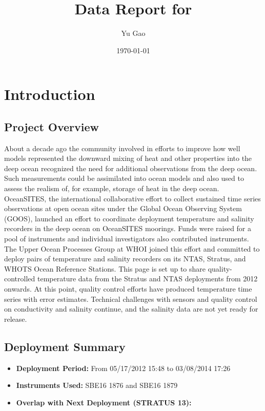\documentclass[11pt]{article}
\title{Data Report for \projectname{} \casenumber{}}
\author{Yu Gao}
\date{\today}
\newcommand{\projectname}{STRATUS}  %
\newcommand{\nextcasenumber}{13}  %
\newcommand{\FirstInstrumentType}{SBE16}  %
\newcommand{\SecondInstrumentType}{SBE16}  %
\newcommand{\DeploymentSpike}{05/17/2012 15:48} %
\newcommand{\RecoverySpike}{03/08/2014 17:26} %
\newcommand{\FirstInstrument}{1876}
\newcommand{\SecondInstrument}{1879}
\begin{document}
\maketitle
\tableofcontents
\newpage

\section{Introduction}

\subsection{Project Overview}

About a decade ago the community involved in  efforts to improve how well models
represented the downward mixing of heat and other properties into the deep ocean
recognized the need for additional observations from the deep ocean.  Such measurements
could be assimilated into ocean models and also used to assess the realism of, for example,
storage of heat in the deep ocean.  OceanSITES, the international collaborative effort to collect sustained time series observations at open ocean sites under the Global Ocean Observing System
(GOOS), launched an effort to coordinate deployment temperature and salinity
recorders in the deep ocean on OceanSITES moorings. Funds were raised for a pool of
instruments and individual investigators also contributed instruments. The Upper Ocean
Processes Group at WHOI joined this effort and committed to deploy pairs of temperature and salinity recorders on its NTAS, Stratus, and WHOTS Ocean Reference Stations.  This page is set
up to share quality-controlled temperature data from the Stratus and NTAS deployments from
2012 onwards.  At this point, quality control efforts have produced temperature time series with
error estimates.  Technical challenges with sensors and quality control on conductivity and salinity continue, and the salinity data are not yet ready for release.

\subsection{Deployment Summary}
\begin{itemize}
    \item \textbf{Deployment Period:} From \DeploymentSpike{} to \RecoverySpike{}
    \item \textbf{Instruments Used:} \FirstInstrumentType{} \FirstInstrument{} and \SecondInstrumentType{} \SecondInstrument{}
    \item \textbf{Overlap with Next Deployment (\projectname{} \nextcasenumber{}):} \HasNextDeploymentOverlap{}
\end{itemize}
\end{document}
